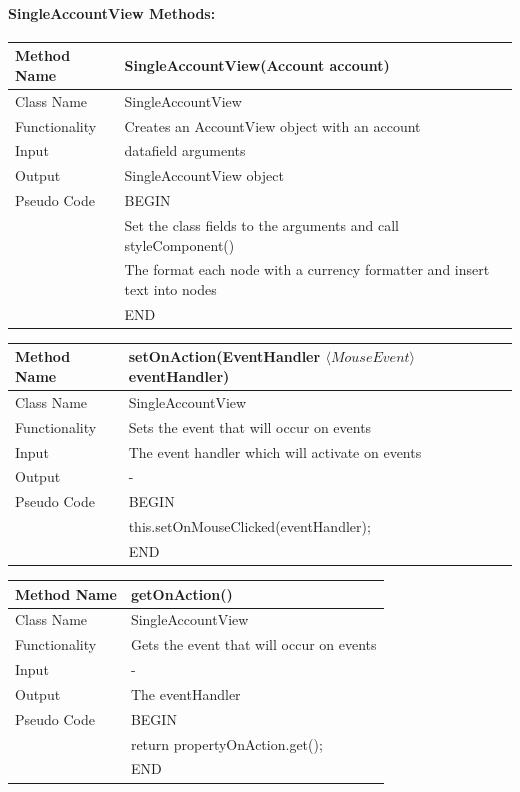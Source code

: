 \documentclass[12pt]{article}
\begin{document}
\paragraph{SingleAccountView Methods:}
\begin{tabular}{ |p{3cm}||p{\colWidth}|  }
	\hline
	Method Name &  SingleAccountView(Account account)\\
	\hline
	Class Name & SingleAccountView\\
	\hline
	Functionality & Creates an AccountView object with an account\\
	\hline
	Input & datafield arguments\\
	\hline
	Output & SingleAccountView object\\
	\hline
	Pseudo Code&BEGIN\\ & Set the class fields to the arguments and call styleComponent()\\
	& The format each node with a currency formatter and insert text into nodes\\&END\\
	\hline
\end{tabular} 


\begin{tabular}{ |p{3cm}||p{\colWidth}|  }
	\hline
	Method Name &  setOnAction(EventHandler $\langle MouseEvent \rangle$ eventHandler)\\
	\hline
	Class Name & SingleAccountView\\
	\hline
	Functionality & Sets the event that will occur on events\\
	\hline
	Input & The event handler which will activate on events\\
	\hline
	Output & -\\
	\hline
	Pseudo Code&BEGIN\\ & this.setOnMouseClicked(eventHandler);\\&END\\
	\hline
\end{tabular}  


\begin{tabular}{ |p{3cm}||p{\colWidth}|  }
	\hline
	Method Name &  getOnAction()\\
	\hline
	Class Name & SingleAccountView\\
	\hline
	Functionality & Gets the event that will occur on events\\
	\hline
	Input & -\\
	\hline
	Output & The eventHandler\\
	\hline
	Pseudo Code &BEGIN\\& return propertyOnAction.get();\\&END\\
	\hline
\end{tabular}  
\end{document}
